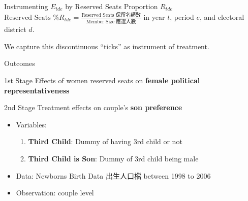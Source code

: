 \documentclass[
  10pt,
  ignorenonframetext,
  aspectratio=43,
]{beamer}
\providecommand{\tightlist}{%
  \setlength{\itemsep}{0pt}\setlength{\parskip}{0pt}}
\begin{document}
\begin{frame}{Instrumenting \(E_{tde}\) by Reserved Seats Proportion
\(R_{tde}\)}
\protect\hypertarget{instrumenting-e_tde-by-reserved-seats-proportion-r_tde}{}
\(\text{Reserved Seats \% } R_{tde} = \frac{\text{Reserved Seats 保留名額數}}{\text{Member Size 應選人數}}\)
in year \(t\), period \(e\), and electoral district \(d\).

\begin{figure}[htb]
\centering
{}
\end{figure}

We capture this discontinuous ``ticks'' as instrument of treatment.
\end{frame}

\begin{frame}{Outcomes}
\protect\hypertarget{outcomes}{}
\begin{block}{1st Stage}
\protect\hypertarget{st-stage}{}
Effects of women reserved seats on \textbf{female political
representativeness}
\end{block}

\begin{block}{2nd Stage}
\protect\hypertarget{nd-stage}{}
Treatment effects on couple's \textbf{son preference}

\begin{itemize}
\tightlist
\item
  Variables:

  \begin{enumerate}
  \tightlist
  \item
    \textbf{Third Child}: Dummy of having 3rd child or not
  \item
    \textbf{Third Child is Son}: Dummy of 3rd child being male
  \end{enumerate}
\item
  Data: Newborns Birth Data 出生人口檔 between 1998 to 2006
\item
  Observation: couple level
\end{itemize}
\end{block}
\end{frame}
\end{document}
